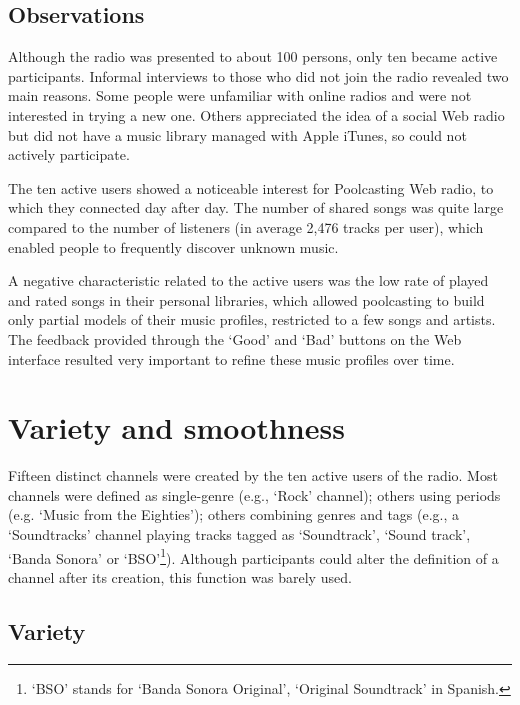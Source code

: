 \subsection{Observations} %
\label{sub:observations12}

Although the radio was presented to about 100 persons, only ten became active participants.
Informal interviews to those who did not join the radio revealed two main reasons. 
Some people were unfamiliar with online radios and were not interested in trying a new one. Others appreciated the idea of a social Web radio but did not have a music library managed with Apple iTunes, so could not actively participate. %

The ten active users showed a noticeable interest for Poolcasting Web radio, to which they connected day after day.
The number of shared songs was quite large compared to the number of listeners (in average 2,476 tracks per user), which enabled people to frequently discover unknown music.

A negative characteristic related to the active users was the low rate of played and rated songs in their personal libraries, which allowed poolcasting to build only partial models of their music profiles, restricted to a few songs and artists. 
The feedback provided through the `Good' and `Bad' buttons on the Web interface resulted very important to refine these music profiles over time.




\section{Variety and smoothness} %
\label{sub:active_channels}

Fifteen distinct channels were created by the ten active users of the radio. 
Most channels were defined as single-genre (e.g., `Rock' channel); others using periods (e.g. `Music from the Eighties'); others combining genres and tags (e.g., a `Soundtracks' channel playing tracks tagged as `Soundtrack', `Sound track', `Banda Sonora' or `BSO'\footnote{`BSO' stands for `Banda Sonora Original', `Original Soundtrack' in Spanish.}).
Although participants could alter the definition of a channel after its creation, this function was barely used.

\subsection{Variety} %
\label{sub:variety2}

